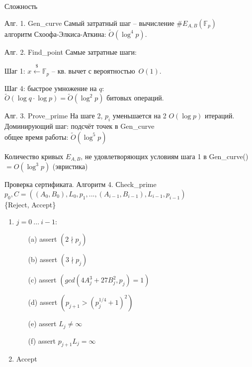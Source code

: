 \documentclass{beamer}
\begin{document}
\begin{frame}{Сложность}
\begin{block}{Алг. 1. Gen\_curve}
Самый затратный шаг -- вычисление $\#E_{A,B}(\mathbb{F}_p)$ \\\structure{$\implies$}
алгоритм Схоофа-Элкиса-Аткина: $\widetilde{O}(\log^4 p)$.
\end{block}
\begin{block}{Алг. 2. Find\_point}
Самые затратные шаги:

Шаг 1: $x \xleftarrow{\$} \mathbb{F}_p$ -- кв. вычет с вероятностью~$O(1)$.

Шаг 4: быстрое умножение на $q$:\\$\widetilde{O}(\log q \cdot \log p) = \widetilde{O}(\log^2 p)$ битовых операций.
\end{block}

\begin{block}{Алг. 3. Prove\_prime}
На шаге 2, $p_i$ уменьшается на 2 \structure{$\implies$} $O(\log p)$ итераций.\\
Доминирующий шаг: подсчёт точек в Gen\_curve \\
\structure{$\implies$} общее время работы: $\widetilde{O}(\log^5 p)$

Количество кривых $E_{A,B}$, не удовлетворяющих условиям шага 1 в Gen\_curve() $= O(\log^3 p)$ (эвристика)
\end{block}
\end{frame}

\begin{frame}{Проверка сертификата. Алгоритм 4. Сheck\_prime}
 $p_0, C =((A_0, B_0), L_0, p_1, ..., (A_{i-1}, B_{i-1}), L_{i-1}, p_{i-1})$\\
 \{Reject, Accept\}
\begin{enumerate}
    \item {} $j = 0\ ...\ i-1$:
    \begin{enumerate}
        \item[(a)] assert $(2 \nmid p_j)$
        \item[(b)] assert $(3 \nmid p_j)$
        \item[(c)] assert $(gcd(4A^3_j + 27B_j^2, p_j) = 1)$
        \item[(d)] assert $(p_{j+1} > (p_j^{1/4} + 1)^2)$
        \item[(e)] assert $L_j \neq \infty$
        \item[(f)] assert $p_{j+1}L_j = \infty$
    \end{enumerate}
    \item {} Accept
\end{enumerate}
\end{frame}
\end{document}
